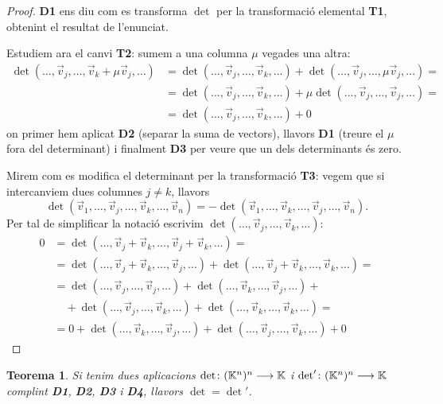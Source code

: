 \documentclass[
  11pt,
]{book}
\numberwithin{dummy}{section}
\theoremstyle{maincolornumbox}
\newtheorem{theorem}{TTTT}[chapter]
\newtheorem{theoremeT}{Teorema}[chapter]
\theoremstyle{blacknumex}
\theoremstyle{blacknumbox}
\theoremstyle{maincolornum}
\renewenvironment{theorem}{\begin{tBox}\begin{theoremeT}}{\end{theoremeT}\end{tBox}}
\begin{document}
\begin{proof}
\textbf{D1} ens diu com es transforma \(\det\) per la transformació
elemental \textbf{T1}, obtenint el resultat de l'enunciat.

Estudiem ara el canvi \textbf{T2}: sumem a una columna \(\mu\) vegades una
altra: \begin{align*}
    \det(\dots, \vec v_j, \dots, \vec v_k+\mu\vec v_j,\dots) & =\det(\dots, \vec v_j, \dots, \vec v_k,\dots) + \det(\dots, \vec v_j, \dots,\mu\vec v_j,\dots)= \\ &
    = \det(\dots, \vec v_j, \dots, \vec v_k,\dots) + \mu\det(\dots, \vec v_j, \dots,\vec v_j,\dots)= \\ &
    = \det(\dots, \vec v_j, \dots, \vec v_k,\dots) + 0
\end{align*} on primer hem aplicat \textbf{D2} (separar la suma de
vectors), llavors \textbf{D1} (treure el \(\mu\) fora del determinant) i
finalment \textbf{D3} per veure que un dels determinants és zero.

Mirem com es modifica el determinant per la transformació \textbf{T3}: vegem
que si intercanviem dues columnes \(j\neq k\), llavors
\[\det(\vec v_1,\dots , \vec v_j, \dots, \vec v_k, \dots ,\vec v_n)=-\det(\vec v_1,\dots , \vec v_k, \dots, \vec v_j, \dots ,\vec v_n) .\]
Per tal de simplificar la notació escrivim
\(\det(\dots , \vec v_j, \dots, \vec v_k, \dots)\): \begin{align*}
        0  & =  \det(\dots , \vec v_j+\vec v_k, \dots, \vec v_j+\vec v_k, \dots)  = \\
          & =  \det(\dots , \vec v_j+\vec v_k, \dots, \vec v_j, \dots) + \det(\dots , \vec v_j+\vec v_k, \dots, \vec v_k, \dots) = \\
          & =  \det(\dots , \vec v_j, \dots, \vec v_j, \dots) + \det(\dots , \vec v_k, \dots, \vec v_j, \dots) + \\
           &  \quad + \det(\dots , \vec v_j, \dots, \vec v_k, \dots) + \det(\dots , \vec v_k, \dots, \vec v_k, \dots) = \\
           & =  0 + \det(\dots , \vec v_k, \dots, \vec v_j , \dots) + \det(\dots , \vec v_j, \dots, \vec v_k , \dots) + 0
\end{align*}
\end{proof}

\begin{theorem}
Si tenim dues aplicacions \(\det\colon (\mathbb{K}^n)^n \longrightarrow \mathbb{K}\) i
\(\det'\colon (\mathbb{K}^n)^n \longrightarrow \mathbb{K}\) complint \textbf{D1}, \textbf{D2}, \textbf{D3} i \textbf{D4},
llavors \(\det=\det'\).
\end{theorem}
\end{document}
